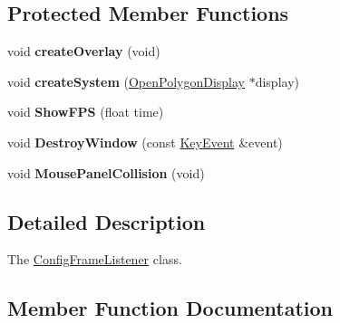 \subsection*{Protected Member Functions}
\begin{DoxyCompactItemize}
\item 
\hypertarget{classEngine_1_1ConfigFrameListener_ae8c208fbe77a97c8d9a7a82ff080e92e}{}void {\bfseries create\+Overlay} (void)\label{classEngine_1_1ConfigFrameListener_ae8c208fbe77a97c8d9a7a82ff080e92e}

\item 
\hypertarget{classEngine_1_1ConfigFrameListener_ae33859ce089cb5f4bc55d3b77bafc125}{}void {\bfseries create\+System} (\hyperlink{classEngine_1_1OpenPolygonDisplay}{Open\+Polygon\+Display} $\ast$display)\label{classEngine_1_1ConfigFrameListener_ae33859ce089cb5f4bc55d3b77bafc125}

\item 
\hypertarget{classEngine_1_1ConfigFrameListener_a52771ab4b5de16c06ce8f98b144308b7}{}void {\bfseries Show\+F\+P\+S} (float time)\label{classEngine_1_1ConfigFrameListener_a52771ab4b5de16c06ce8f98b144308b7}

\item 
\hypertarget{classEngine_1_1ConfigFrameListener_ac60e760b67dbff85a529bb86d3debc15}{}void {\bfseries Destroy\+Window} (const \hyperlink{classEngine_1_1KeyEvent}{Key\+Event} \&event)\label{classEngine_1_1ConfigFrameListener_ac60e760b67dbff85a529bb86d3debc15}

\item 
\hypertarget{classEngine_1_1ConfigFrameListener_a2511ac77cfa18011d978f3223cb2a59a}{}void {\bfseries Mouse\+Panel\+Collision} (void)\label{classEngine_1_1ConfigFrameListener_a2511ac77cfa18011d978f3223cb2a59a}

\end{DoxyCompactItemize}


\subsection{Detailed Description}
The \hyperlink{classEngine_1_1ConfigFrameListener}{Config\+Frame\+Listener} class. 

\subsection{Member Function Documentation}
\hypertarget{classEngine_1_1ConfigFrameListener_a792fe9af553206a358bc888fdc43f2be}{}
